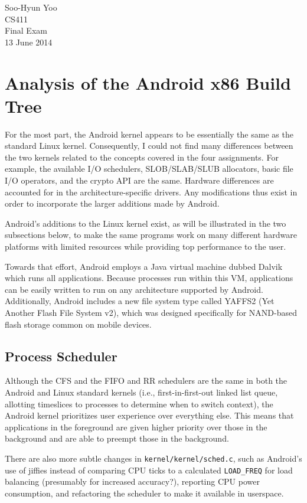\documentclass[12pt,letterpaper]{article}
\begin{document}
Soo-Hyun Yoo \\
CS411 \\
Final Exam \\
13 June 2014


\section*{Analysis of the Android x86 Build Tree}

For the most part, the Android kernel appears to be essentially the same as the
standard Linux kernel. Consequently, I could not find many differences between
the two kernels related to the concepts covered in the four assignments. For
example, the available I/O schedulers, SLOB/SLAB/SLUB allocators, basic file
I/O operators, and the crypto API are the same. Hardware differences are
accounted for in the architecture-specific drivers. Any modifications thus
exist in order to incorporate the larger additions made by Android.

Android's additions to the Linux kernel exist, as will be illustrated in the
two subsections below, to make the same programs work on many different
hardware platforms with limited resources while providing top performance to
the user.

Towards that effort, Android employs a Java virtual machine dubbed Dalvik which
runs all applications. Because processes run within this VM, applications can
be easily written to run on any architecture supported by Android.
Additionally, Android includes a new file system type called YAFFS2 (Yet
Another Flash File System v2), which was designed specifically for NAND-based
flash storage common on mobile devices.


\subsection*{Process Scheduler}

Although the CFS and the FIFO and RR schedulers are the same in both the
Android and Linux standard kernels (i.e., first-in-first-out linked list queue,
allotting timeslices to processes to determine when to switch context), the
Android kernel prioritizes user experience over everything else. This means
that applications in the foreground are given higher priority over those in the
background and are able to preempt those in the background.

There are also more subtle changes in \verb|kernel/kernel/sched.c|, such as
Android's use of jiffies instead of comparing CPU ticks to a calculated
\verb|LOAD_FREQ| for load balancing (presumably for increased accuracy?),
reporting CPU power consumption, and refactoring the scheduler to make it
available in userspace.
\end{document}
